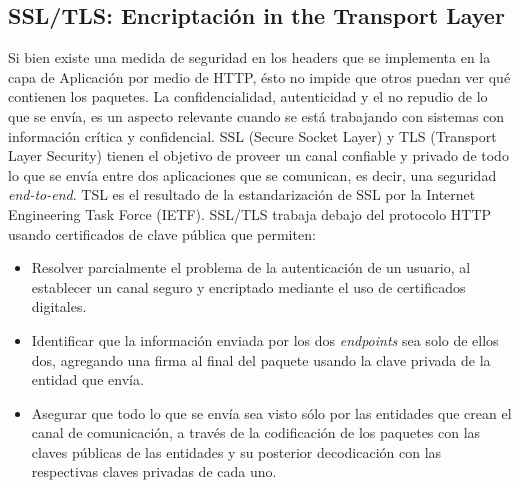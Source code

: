     \subsection{SSL/TLS: Encriptación in the Transport Layer}
    Si bien existe una medida de seguridad en los headers que se implementa en la capa de Aplicación por medio de HTTP, ésto no impide que otros puedan ver qué contienen los paquetes. La confidencialidad, autenticidad y el no repudio de lo que se envía, es un aspecto relevante cuando se está trabajando con sistemas con información crítica y confidencial. SSL (Secure Socket Layer) y TLS (Transport Layer Security) tienen el objetivo de proveer un canal confiable y privado de todo lo que se envía entre dos aplicaciones que se comunican, es decir, una seguridad \textit{end-to-end}. TSL es el resultado de la estandarización de SSL por la Internet Engineering Task Force (IETF). SSL/TLS trabaja debajo del protocolo HTTP usando certificados de clave pública que permiten:
    \begin{itemize}
        \item Resolver parcialmente el problema de la autenticación de un usuario, al establecer un canal seguro y encriptado mediante el uso de certificados digitales.
        \item Identificar que la información enviada por los dos \textit{endpoints} sea solo de ellos dos, agregando una firma al final del paquete usando la clave privada de la entidad que envía.
        \item Asegurar que todo lo que se envía sea visto sólo por las entidades que crean el canal de comunicación, a través de la codificación de los paquetes con las claves públicas de las entidades y su posterior decodicación con las respectivas claves privadas de cada uno.
    \end{itemize}

